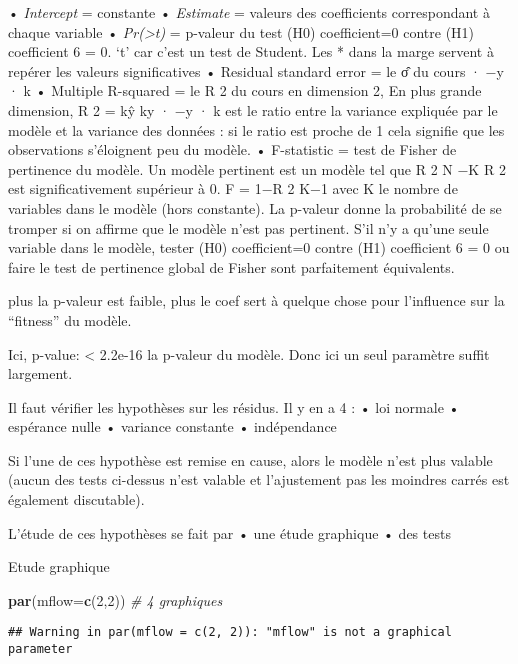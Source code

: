 \documentclass[
]{article}
\newenvironment{Shaded}{\begin{snugshade}}{\end{snugshade}}
\newcommand{\CommentTok}[1]{\textcolor[rgb]{0.56,0.35,0.01}{\textit{#1}}}
\newcommand{\DataTypeTok}[1]{\textcolor[rgb]{0.13,0.29,0.53}{#1}}
\newcommand{\DecValTok}[1]{\textcolor[rgb]{0.00,0.00,0.81}{#1}}
\newcommand{\KeywordTok}[1]{\textcolor[rgb]{0.13,0.29,0.53}{\textbf{#1}}}
\newcommand{\NormalTok}[1]{#1}
\begin{document}
• \emph{Intercept} = constante • \emph{Estimate} = valeurs des
coefficients correspondant à chaque variable •
\emph{Pr(\textgreater\textbar t\textbar)} = p-valeur du test (H0)
coefficient=0 contre (H1) coefficient 6 = 0. `t' car c'est un test de
Student. Les * dans la marge servent à repérer les valeurs
significatives • Residual standard error = le σ̂ du cours · −y · k •
Multiple R-squared = le R 2 du cours en dimension 2, En plus grande
dimension, R 2 = kŷ ky · −y · k est le ratio entre la variance expliquée
par le modèle et la variance des données : si le ratio est proche de 1
cela signifie que les observations s'éloignent peu du modèle. •
F-statistic = test de Fisher de pertinence du modèle. Un modèle
pertinent est un modèle tel que R 2 N −K R 2 est significativement
supérieur à 0. F = 1−R 2 K−1 avec K le nombre de variables dans le
modèle (hors constante). La p-valeur donne la probabilité de se tromper
si on affirme que le modèle n'est pas pertinent. S'il n'y a qu'une seule
variable dans le modèle, tester (H0) coefficient=0 contre (H1)
coefficient 6 = 0 ou faire le test de pertinence global de Fisher sont
parfaitement équivalents.

plus la p-valeur est faible, plus le coef sert à quelque chose pour
l'influence sur la ``fitness'' du modèle.

Ici, p-value: \textless{} 2.2e-16 la p-valeur du modèle. Donc ici un
seul paramètre suffit largement.

Il faut vérifier les hypothèses sur les résidus. Il y en a 4 : • loi
normale • espérance nulle • variance constante • indépendance

Si l'une de ces hypothèse est remise en cause, alors le modèle n'est
plus valable (aucun des tests ci-dessus n'est valable et l'ajustement
pas les moindres carrés est également discutable).

L'étude de ces hypothèses se fait par • une étude graphique • des tests

Etude graphique

\begin{Shaded}
\begin{Highlighting}[]
\KeywordTok{par}\NormalTok{(}\DataTypeTok{mflow=}\KeywordTok{c}\NormalTok{(}\DecValTok{2}\NormalTok{,}\DecValTok{2}\NormalTok{)) }\CommentTok{# 4 graphiques}
\end{Highlighting}
\end{Shaded}

\begin{verbatim}
## Warning in par(mflow = c(2, 2)): "mflow" is not a graphical parameter
\end{verbatim}
\end{document}
